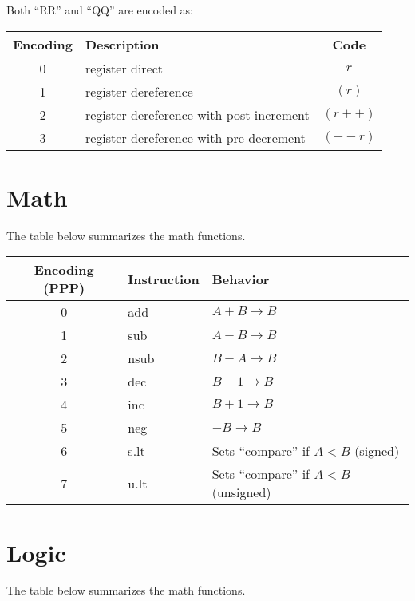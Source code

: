 \documentclass[10pt]{article}
\begin{document}
Both ``RR'' and ``QQ'' are encoded as:

\begin{tabular}{|c|l|c|}
\hline
Encoding & Description & Code \\
\hline
\hline
0 & register direct & $r$ \\
\hline
1 & register dereference & $(r)$ \\
\hline
2 & register dereference with post-increment & $(r++)$ \\
\hline
3 & register dereference with pre-decrement & $(--r)$ \\
\hline
\end{tabular}


\section{Math}

The table below summarizes the math functions.

\begin{tabular}{|c||l|l|}
\hline
Encoding (PPP) & Instruction & Behavior \\
\hline
\hline
0 & add & $A+B \to B$ \\
\hline
1 & sub & $A-B \to B$ \\
\hline
2 & nsub & $B-A \to B$ \\
\hline
3 & dec & $B-1 \to B$ \\
\hline
4 & inc & $B+1 \to B$ \\
\hline
5 & neg & $-B \to B$ \\
\hline
6 & s.lt & Sets ``compare'' if $A < B$ (signed) \\
\hline
7 & u.lt & Sets ``compare'' if $A < B$ (unsigned) \\
\hline
\end{tabular}


\section{Logic}

The table below summarizes the math functions.
\end{document}
